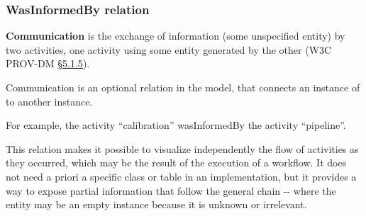 \subsubsection{WasInformedBy relation}

\textbf{Communication} is the exchange of information (some unspecified entity) by two activities, one activity using some entity generated by the other (W3C PROV-DM \href{https://www.w3.org/TR/prov-dm/#term-Communication}{\S5.1.5}).

Communication is an optional relation  in the model, that connects an instance of  to another instance.

For example, the activity ``calibration'' wasInformedBy the activity ``pipeline''.

This relation makes it possible to visualize independently the flow of activities as they occurred, which may be the result of the execution of a workflow. It does not need a priori a specific class or table in an implementation, but it provides a way to expose partial information that follow the general chain -- where the entity may be an empty instance because it is unknown or irrelevant.






